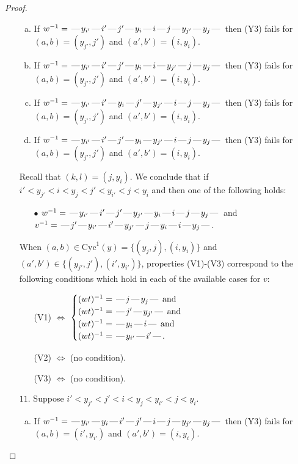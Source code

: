 \documentclass[10pt]{article}
\theoremstyle{definition}
\theoremstyle{definition}
\def\dash{\text{\hspace{0.5mm}---\hspace{0.5mm}}}
\def\Cyc{\mathrm{Cyc}}
\begin{document}
\begin{proof}
\begin{enumerate}
\begin{enumerate}[(a)]
\item If $w^{-1} = \dash y_{i'}\dash i'\dash j'\dash y_i\dash i\dash j\dash y_{j'}\dash y_j\dash $ then (Y3) fails for $(a,b)=(y_{j'},j')$ and $(a',b')=(i,y_i)$.
\item If $w^{-1} = \dash y_{i'}\dash i'\dash j'\dash y_i\dash i\dash y_{j'}\dash j\dash y_j\dash $ then (Y3) fails for $(a,b)=(y_{j'},j')$ and $(a',b')=(i,y_i)$.
\item If $w^{-1} = \dash y_{i'}\dash i'\dash y_i\dash j'\dash y_{j'}\dash i\dash j\dash y_j\dash $ then (Y3) fails for $(a,b)=(y_{j'},j')$ and $(a',b')=(i,y_i)$.
\item If $w^{-1} = \dash y_{i'}\dash i'\dash j'\dash y_i\dash y_{j'}\dash i\dash j\dash y_j\dash $ then (Y3) fails for $(a,b)=(y_{j'},j')$ and $(a',b')=(i,y_i)$.
\end{enumerate}
Recall that $(k,l) = (j,y_i)$.
We conclude that if $i' < y_{j'} < i < y_j < j' < y_{i'} < j < y_i$ and then one of the following holds:
\begin{enumerate}
\item[$\bullet$] $w^{-1} = \dash y_{i'}\dash i'\dash j'\dash y_{j'}\dash y_i\dash i\dash j\dash y_j\dash $ and $v^{-1} = \dash j'\dash y_{i'}\dash i'\dash y_{j'}\dash j\dash y_i\dash i\dash y_j\dash $.
\end{enumerate}
When $(a,b)\in\Cyc^1(y)=\{(y_j,j),(i,y_i)\}$ and $(a',b')\in\{(y_{j'},j'),(i',y_{i'})\}$,
properties (V1)-(V3) correspond to the following conditions which hold in
each of the available cases for $v$:
\begin{enumerate}
\item[](V1) $\Leftrightarrow$ $\begin{cases}\text{$(wt)^{-1} = \dash j \dash y_j \dash$}\text{ and }\\
\text{$(wt)^{-1} = \dash j' \dash y_{j'} \dash$}\text{ and }\\
\text{$(wt)^{-1} = \dash y_i \dash i \dash$}\text{ and }\\
\text{$(wt)^{-1} = \dash y_{i'} \dash i' \dash$}.\end{cases}$
\item[](V2) $\Leftrightarrow$ (no condition).
\item[](V3) $\Leftrightarrow$ (no condition).
\end{enumerate}
\item[$11$.] Suppose $i' < y_{j'} < j' < i < y_j < y_{i'} < j < y_i$.
\begin{enumerate}[(a)]
\item If $w^{-1} = \dash y_{i'}\dash y_i\dash i'\dash j'\dash i\dash j\dash y_{j'}\dash y_j\dash $ then (Y3) fails for $(a,b)=(i',y_{i'})$ and $(a',b')=(i,y_i)$.

\end{enumerate}
\end{enumerate}
\end{proof}
\end{document}

